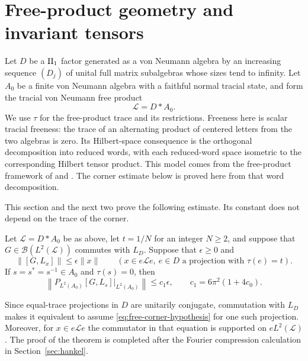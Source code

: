 \section{Free-product geometry and invariant tensors}
\label{sec:tensors}

Let $D$ be a ${\rm II}_1$ factor generated as a von Neumann algebra
by an increasing sequence
$(D_j)$ of unital full matrix subalgebras whose sizes tend to infinity.
Let $A_0$ be a finite von Neumann algebra with a faithful normal tracial
state, and form the tracial von Neumann free product
\[
  \mathcal L=D*A_0.
\]
We use $\tau$ for the free-product trace and its restrictions.  Freeness
here is scalar tracial freeness: the trace of an alternating product of
centered letters from the two algebras is zero.  Its Hilbert-space
consequence is the orthogonal decomposition into reduced words, with
each reduced-word space isometric to the corresponding Hilbert tensor
product. This model comes from the free-product framework of
\citet{Ching1973} and \citet{Voiculescu1985}. The corner estimate below
is proved here from that word decomposition.

This section and the next two prove the following estimate.  Its constant
does not depend on the trace of the corner.

\begin{theorem}\label{thm:free-corner}
Let $\mathcal L=D*A_0$ be as above, let $t=1/N$ for an integer $N\geq2$,
and suppose that $G\in\mathcal B(L^2(\mathcal L))$ commutes with $L_D$.
Suppose that $\epsilon\geq0$ and
\begin{equation}\label{eq:free-corner-hypothesis}
  \|[G,L_x]\|\leq\epsilon\|x\|
  \qquad
  (x\in e\mathcal L e,
   \ e\in D\text{ a projection with }\tau(e)=t).
\end{equation}
If $s=s^*=s^{-1}\in A_0$ and $\tau(s)=0$, then
\begin{equation}\label{eq:free-corner-conclusion}
 \left\|P_{L^2(A_0)}[G,L_s]\big|_{L^2(A_0)}\right\|
       \leq c_1\epsilon,
 \qquad c_1=6\pi^2(1+4c_0).
\end{equation}
\end{theorem}

Since equal-trace projections in $D$ are unitarily conjugate,
commutation with $L_D$ makes it equivalent to assume
\eqref{eq:free-corner-hypothesis} for one such projection.  Moreover,
for $x\in e\mathcal L e$ the commutator in that equation is supported on
$eL^2(\mathcal L)$.  The proof of the theorem is completed after the
Fourier compression calculation in Section~\ref{sec:hankel}.

